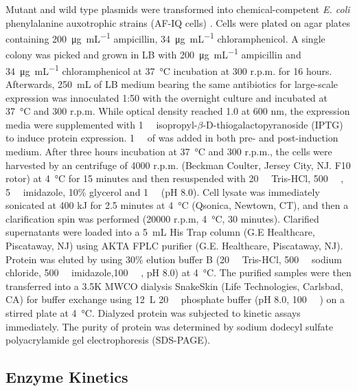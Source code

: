 \begin{refsection}
Mutant and wild type plasmids were transformed into
chemical-competent \emph{E.  coli} phenylalanine auxotrophic strains (AF-IQ
cells) \cite{Yang2014a}. Cells were plated on agar plates containing
\SI{200}{\ug\per\mL} ampicillin, \SI{34}{\ug\per\mL} chloramphenicol. A single
colony was picked and grown in LB with \SI{200}{\ug\per\mL} ampicillin and
\SI{34}{\ug\per\mL} chloramphenicol at \SI{37}{\celsius} incubation at 300
r.p.m. for 16 hours.  Afterwards, \SI{250}{\mL} of LB medium bearing the same
antibiotics for large-scale expression was innoculated 1:50 with the overnight
culture and incubated at \SI{37}{\celsius} and 300 r.p.m. While optical density
reached 1.0 at 600 nm, the expression media were supplemented with
\SI{1}{\milli\Molar} isopropyl-$\beta$-D-thiogalactopyranoside (IPTG) to induce
protein expression.  \SI{1}{\milli\Molar} of  was added in both pre-
and post-induction medium.  After three hours incubation at \SI{37}{\celsius}
and 300 r.p.m., the cells were harvested by an centrifuge of 4000 r.p.m.
(Beckman Coulter, Jersey City, NJ. F10 rotor) at \SI{4}{\celsius} for 15
minutes and then resuspended with \SI{20}{\milli\Molar} Tris-HCl,
\SI{500}{\milli\Molar} , \SI{5}{\milli\Molar} imidazole, 10\% glycerol
and \SI{1}{\micro\Molar}  (pH 8.0). Cell lysate was immediately
sonicated at 400 kJ for 2.5 minutes at \SI{4}{\celsius} (Qsonica, Newtown, CT),
and then a clarification spin was performed (20000 r.p.m, \SI{4}{\celsius}, 30
minutes).  Clarified supernatants were loaded into a \SI{5}{\mL} His Trap
column (G.E Healthcare, Piscataway, NJ) using AKTA FPLC purifier (G.E.
Healthcare, Piscataway, NJ).  Protein was eluted by using 30\% elution buffer B
(\SI{20}{\milli\Molar} Tris-HCl, \SI{500}{\milli\Molar} sodium chloride,
\SI{500}{\milli\Molar} imidazole,\SI{100}{\micro\Molar} , pH 8.0) at
\SI{4}{\celsius}.  The purified samples were then transferred into a 3.5K MWCO
dialysis SnakeSkin (Life Technologies, Carlsbad, CA) for buffer exchange using
\SI{12}{\L} \SI{20}{\milli\Molar} phosphate buffer (pH 8.0,
\SI{100}{\micro\Molar} ) on a stirred plate at \SI{4}{\celsius}.
Dialyzed protein was subjected to kinetic assays immediately. The purity of
protein was determined by sodium dodecyl sulfate polyacrylamide gel
electrophoresis (SDS-PAGE).

\subsection{Enzyme Kinetics}


\end{refsection}
